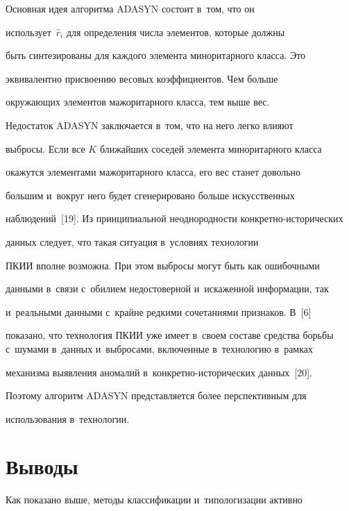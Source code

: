 \begin{enumerate}[(1)]
  Основная идея алгоритма ADASYN состоит в~том, что он 


использует~$\hat{r}_i$ для определения числа элементов, которые должны 


быть синтезированы для каждого элемента миноритарного класса. Это 


эквивалентно присвоению весовых коэффициентов. Чем больше 


окружающих элементов мажоритарного класса, тем выше вес.


  


  Недостаток ADASYN заключается в~том, что на него легко влияют 


выбросы. Если все $K$ ближайших соседей элемента миноритарного класса 


окажутся элементами мажоритарного класса, его вес станет довольно 


большим и~вокруг него будет сгенерировано больше искусственных 


наблюдений~[19]. Из принципиальной неоднородности кон\-крет\-но-ис\-то\-ри\-че\-ских 


данных следует, что такая ситуация в~условиях технологии 


ПКИИ вполне возможна. При этом выбросы могут быть как ошибочными 


данными в~связи с~оби\-ли\-ем недостоверной и~искаженной информации, так 


и~реальными данными с~крайне редкими сочетаниями признаков. В~[6] 


показано, что технология ПКИИ уже имеет в~своем составе средства борьбы с~шумами в~данных и~выбросами, включенные в~технологию в~рамках 


механизма выявления аномалий в~конкретно-исторических данных~[20]. 


Поэтому алгоритм ADASYN представляется более перспективным для 


использования в~технологии.


  \end{enumerate}


  


\section{Выводы}





  Как показано выше, методы классификации и~типологизации активно 


